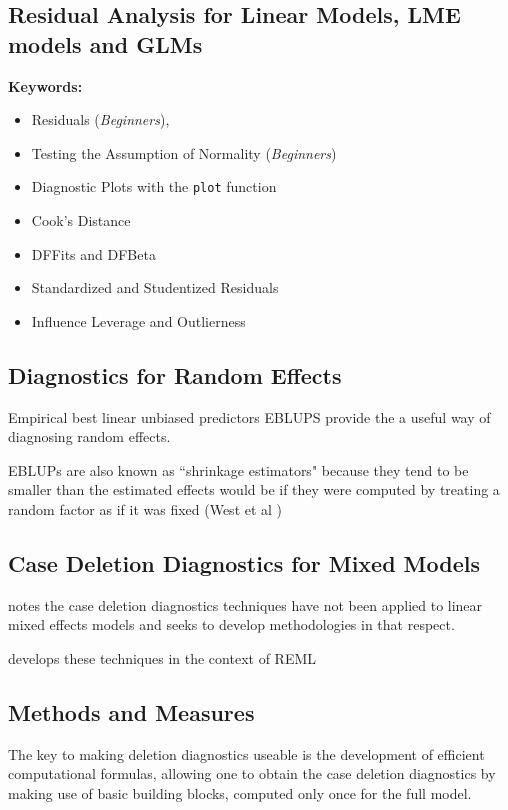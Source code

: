 \documentclass[12pt, a4paper]{article}
\begin{document}
\subsection{Residual Analysis for Linear Models, LME models and GLMs}

\textbf{Keywords:}

\begin{itemize}
	\item Residuals (\emph{Beginners}), 
	\item Testing the Assumption of Normality (\emph{Beginners})
	\item Diagnostic Plots with the \texttt{plot} function
	\item Cook's Distance
	\item DFFits and DFBeta
	\item Standardized and Studentized Residuals
	\item Influence Leverage and Outlierness
\end{itemize}


\subsection{Diagnostics for Random Effects}
Empirical best linear unbiased predictors EBLUPS provide the a useful way of diagnosing random effects.

EBLUPs are also known as ``shrinkage estimators" because they tend to be smaller than the estimated effects would be if they were computed by treating a random factor as if it was fixed (West et al )







\subsection{Case Deletion Diagnostics for Mixed Models}

\citet{Christiansen} notes the case deletion diagnostics techniques have not been applied to linear mixed effects models and seeks to develop methodologies in that respect.

\citet{Christiansen} develops these techniques in the context of REML

\subsection{Methods and Measures}
The key to making deletion diagnostics useable is the development of efficient computational formulas, allowing one to obtain the  case deletion diagnostics by making use of basic building blocks, computed only once for the full model.
\end{document}
